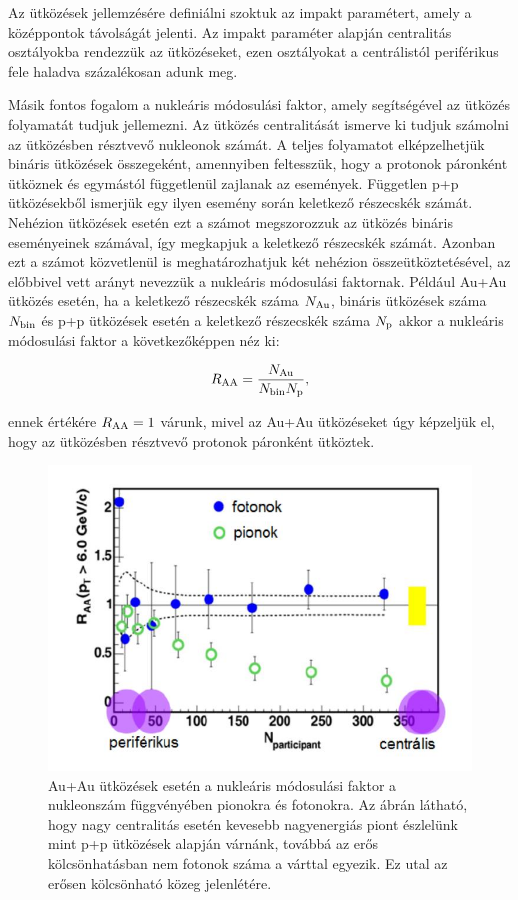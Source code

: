 \documentclass[10pt,a4paper]{article}
\numberwithin{equation}{subsection}
\numberwithin{figure}{section}
\begin{document}
Az ütközések jellemzésére definiálni szoktuk az impakt paramétert, amely a középpontok távolságát jelenti. Az impakt paraméter alapján centralitás osztályokba rendezzük az ütközéseket, ezen osztályokat a centrálistól periférikus fele haladva százalékosan adunk meg.

Másik fontos fogalom a nukleáris módosulási faktor, amely segítségével az ütközés folyamatát tudjuk jellemezni. Az ütközés centralitását ismerve ki tudjuk számolni az ütközésben résztvevő nukleonok számát. A teljes folyamatot elképzelhetjük bináris ütközések összegeként, amennyiben feltesszük, hogy a protonok páronként ütköznek és egymástól függetlenül zajlanak az események. Független p+p ütközésekből ismerjük egy ilyen esemény során keletkező részecskék számát. Nehézion ütközések esetén ezt a számot megszorozzuk az ütközés bináris eseményeinek számával, így megkapjuk a keletkező részecskék számát. Azonban ezt a számot közvetlenül is meghatározhatjuk két nehézion összeütköztetésével, az előbbivel vett arányt nevezzük a nukleáris módosulási faktornak. Például Au+Au ütközés esetén, ha a keletkező részecskék száma $N_{{\rm Au}}$, bináris ütközések száma $N_{{\rm bin}}$ és p+p ütközések esetén a keletkező részecskék száma $N_{{\rm p}}$ akkor a nukleáris módosulási faktor a következőképpen néz ki:
\begin{large}
\begin{equation}
R_{\rm AA}=\frac{N_{\rm Au}}{N_{\rm bin}N_{\rm p}},
\label{eq:e1}
\end{equation}
\end{large}
ennek értékére  $R_{\rm AA}=1$ várunk, mivel az Au+Au ütközéseket úgy képzeljük el, hogy az ütközésben résztvevő protonok páronként ütköztek.  

\begin{center}
\begin{figure}[H]
\centering
\includegraphics[scale=0.6]{pic/int/p1}
 \caption{Au+Au ütközések esetén a nukleáris módosulási faktor a nukleonszám függvényében pionokra és fotonokra. Az ábrán látható, hogy nagy centralitás esetén kevesebb nagyenergiás piont észlelünk mint p+p ütközések alapján várnánk, továbbá az erős kölcsönhatásban nem 
  fotonok száma a várttal egyezik. Ez utal az erősen kölcsönható közeg jelenlétére.}
\label{fig:mmf}
\end{figure}
\end{center}
\end{document}

